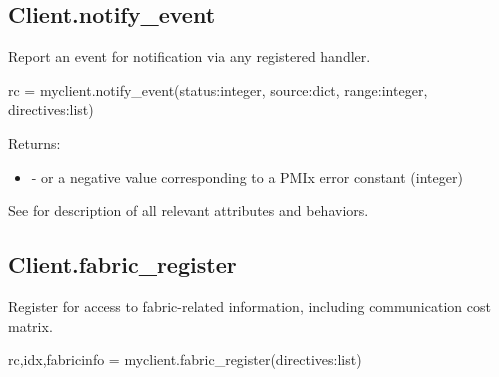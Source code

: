 \subsection{Client.notify_event}

\summary

Report an event for notification via any registered handler.

\format

\pyspecificstart
\begin{codepar}
rc = myclient.notify_event(status:integer, source:dict,
                           range:integer, directives:list)
\end{codepar}
\pyspecificend

\begin{arglist}
\end{arglist}

Returns:
\begin{itemize}
    \item {} -  or a negative value corresponding to a PMIx error constant (integer)
\end{itemize}

See  for description of all relevant attributes and behaviors.


\subsection{Client.fabric_register}

\summary
Register for access to fabric-related information, including communication cost matrix.

\format

\pyspecificstart
\begin{codepar}
rc,idx,fabricinfo = myclient.fabric_register(directives:list)
\end{codepar}
\pyspecificend


\begin{arglist}
\end{arglist}

